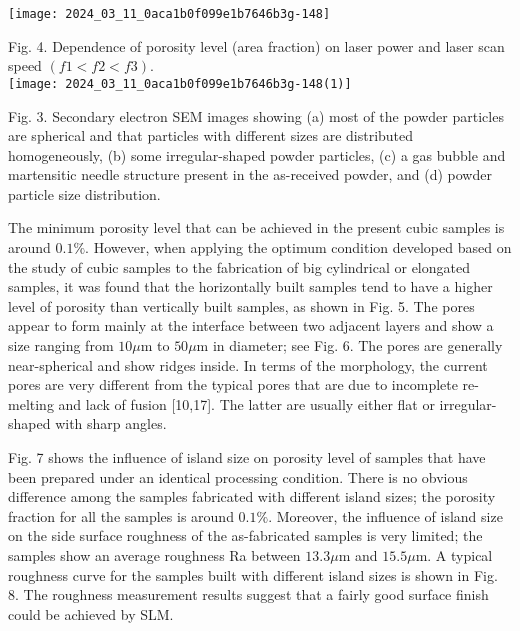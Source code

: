 \documentclass[10pt]{article}
\begin{document}
\begin{center}
\texttt{[image: 2024\_03\_11\_0aca1b0f099e1b7646b3g-148]}
\end{center}

Fig. 4. Dependence of porosity level (area fraction) on laser power and laser scan speed $(f 1<f 2<f 3)$.\\
\texttt{[image: 2024\_03\_11\_0aca1b0f099e1b7646b3g-148(1)]}

Fig. 3. Secondary electron SEM images showing (a) most of the powder particles are spherical and that particles with different sizes are distributed homogeneously, (b) some irregular-shaped powder particles, (c) a gas bubble and martensitic needle structure present in the as-received powder, and (d) powder particle size distribution.

The minimum porosity level that can be achieved in the present cubic samples is around $0.1 \%$. However, when applying the optimum condition developed based on the study of cubic samples to the fabrication of big cylindrical or elongated samples, it was found that the horizontally built samples tend to have a higher level of porosity than vertically built samples, as shown in Fig. 5. The pores appear to form mainly at the interface between two adjacent layers and show a size ranging from $10 \mu \mathrm{m}$ to $50 \mu \mathrm{m}$ in diameter; see Fig. 6. The pores are generally near-spherical and show ridges inside. In terms of the morphology, the current pores are very different from the typical pores that are due to incomplete re-melting and lack of fusion [10,17]. The latter are usually either flat or irregular-shaped with sharp angles.

Fig. 7 shows the influence of island size on porosity level of samples that have been prepared under an identical processing condition. There is no obvious difference among the samples fabricated with different island sizes; the porosity fraction for all the samples is around $0.1 \%$. Moreover, the influence of island size on the side surface roughness of the as-fabricated samples is very limited; the samples show an average roughness Ra between $13.3 \mu \mathrm{m}$ and $15.5 \mu \mathrm{m}$. A typical roughness curve for the samples built with different island sizes is shown in Fig. 8. The roughness measurement results suggest that a fairly good surface finish could be achieved by SLM.
\end{document}
